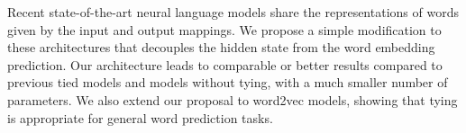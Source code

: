 Recent state-of-the-art neural language models share the representations of words given by the input and output mappings. We propose a simple modification to these architectures that decouples the hidden state from the word embedding prediction. Our architecture leads to comparable or better results compared to previous tied models and models without tying, with a much smaller number of parameters. We also extend our proposal to word2vec models, showing that tying is appropriate for general word prediction tasks.
